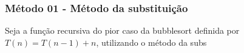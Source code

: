 \subsubsection{Método 01 - Método da substituição}
Seja a função recursiva do pior caso da bubblesort definida por $T(n) = T(n-1) + n$, utilizando o método da subs
